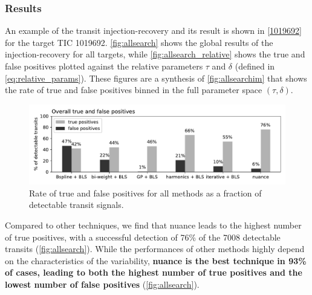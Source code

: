 \documentclass[modern]{aastex631}
\newcommand{\nuancecode}{\textsf{nuance}}
\begin{document}
\subsubsection*{Results}
An example of the transit injection-recovery and its result is shown in \autoref{1019692} for the target TIC 1019692. \autoref{fig:allsearch} shows the global results of the injection-recovery for all targets, while \autoref{fig:allsearch_relative} shows the true and false positives plotted against the relative parameters $\tau$ and $\delta$ (defined in \autoref{eq:relative_params}). These figures are a synthesis of \autoref{fig:allsearchim} that shows the rate of true and false positives binned in the full parameter space $(\tau, \delta)$.
\begin{figure}[H]
    \begin{centering}
        \includegraphics[width=\linewidth]{../workflows/tess_injection_recovery/figures/tpfp_bars.pdf}
        \caption{Rate of true and false positives for all methods as a fraction of detectable transit signals.}
        \label{fig:allsearch}
    \end{centering}
\end{figure}
Compared to other techniques, we find that \nuancecode{} leads to the highest number of true positives, with a successful detection of 76\% of the 7008 detectable transits (\autoref{fig:allsearch}). While the performances of other methods highly depend on the characteristics of the variability, \textbf{\nuancecode{} is the best technique in 93\% of cases, leading to both the highest number of true positives and the lowest number of false positives} (\autoref{fig:allsearch}).
\end{document}
